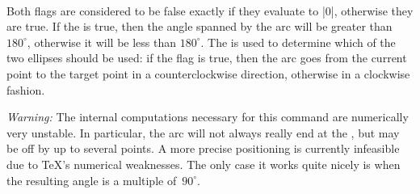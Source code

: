 \begin{command}{\pgfpatharcto{} \\}
\begin{codeexample}[]
\end{codeexample}
    Both flags are considered to be false exactly if they evaluate to |0|,
    otherwise they are true. If the  is true, then the
    angle spanned by the arc will be greater than $180^\circ$, otherwise it
    will be less than $180^\circ$. The  is used to
    determine which of the two ellipses should be used: if the flag is true,
    then the arc goes from the current point to the target point in a
    counterclockwise direction, otherwise in a clockwise fashion.
\begin{codeexample}[]
\end{codeexample}
    \emph{Warning:} The internal computations necessary for this command are
    numerically very unstable. In particular, the arc will not always really
    end at the , but may be off by up to several
    points. A more precise positioning is currently infeasible due to \TeX's
    numerical weaknesses. The only case it works quite nicely is when the
    resulting angle is a multiple of~$90^\circ$.
\end{command}

